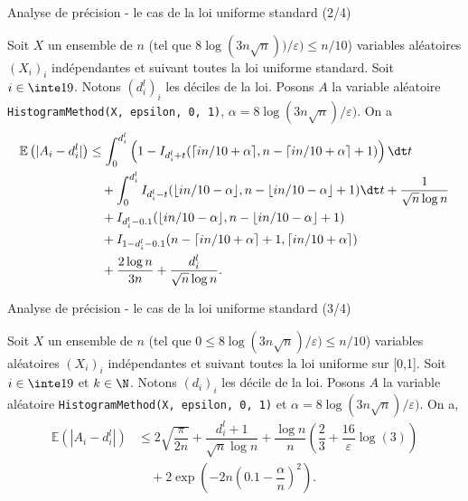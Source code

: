 \documentclass[10pt,serif]{beamer}
\begin{document}
  \begin{frame}{Analyse de précision - le cas de la loi uniforme standard (2/4)}
    \begin{corollary}
      \label{coro_err_quadra}
      Soit \(X\) un ensemble de \(n\) (tel que \(8\log(3n\sqrt n))/\varepsilon) \leq n/10\)) variables aléatoires \((X_i)_i\) indépendantes et suivant toutes la loi uniforme standard. Soit \(i \in \inte 1 9 \). Notons \((d_i^l)_i\) les déciles de la loi. Posons \(A\) la variable aléatoire \texttt{HistogramMethod(X, epsilon, 0, 1)}, \(\alpha = 8\log(3n\sqrt n)/\varepsilon)\). On a 
      \vspace{-0.3cm}
      \begin{align*}
          \mathbb E\left( |A_i - d_i^l| \right) & \leq \int_{0}^{d_i^l}\left( 1 - I_{d_i^l + t}(\lceil in/10 + \alpha\rceil, n - \lceil in/10 + \alpha \rceil + 1) \right) \dt t\\
          &\quad + \int_{0}^{d_i^l}I_{d_i^l - t}(\lfloor in/10 - \alpha \rfloor , n - \lfloor in/10 - \alpha \rfloor + 1) \dt t + \dfrac{1}{\sqrt n \log n}\\
          &\quad  + I_{d_i^l - 0.1}(\lfloor in/10 - \alpha \rfloor , n - \lfloor in/10 - \alpha \rfloor + 1)\\
          &\quad + I_{1 - d_i^l - 0.1}(n - \lceil in/10 + \alpha \rceil + 1, \lceil in/10 + \alpha\rceil)\\
          &\quad  + \dfrac{2\log n}{3n} + \dfrac{d_i^l}{\sqrt n \log n}.
      \end{align*}
    \end{corollary}
  \end{frame}

  \begin{frame}{Analyse de précision - le cas de la loi uniforme standard (3/4)}
    \begin{theorem}
      Soit \(X\) un ensemble de \(n\) (tel que \(0\leq 8\log(3n\sqrt n)/\varepsilon) \leq n/10\)) variables aléatoires \((X_i)_i\) indépendantes et suivant toutes la loi uniforme sur [0,1]. Soit \(i \in \inte 1 9 \) et \(k \in \N\). Notons \((d_i)_i\) les décile de la loi. Posons \(A\) la variable aléatoire  \texttt{HistogramMethod(X, epsilon, 0, 1)} et \(\alpha = 8\log(3n\sqrt n)/\varepsilon)\). On a,
      \begin{align*}
          \mathbb E\left( |A_i - d_i^l| \right) & \leq 2\sqrt{\dfrac{\pi}{2n}} + \dfrac{d_i^l + 1}{\sqrt n \log n} + \dfrac{\log n}{n}\left( \dfrac{2}{3} + \dfrac{16}{\varepsilon}\log(3) \right)\\
          & \quad + 2\exp\left( -2n\left(0.1 - \dfrac{\alpha}{n}\right)^2 \right).
      \end{align*}
    \end{theorem}
  \end{frame}
\end{document}
